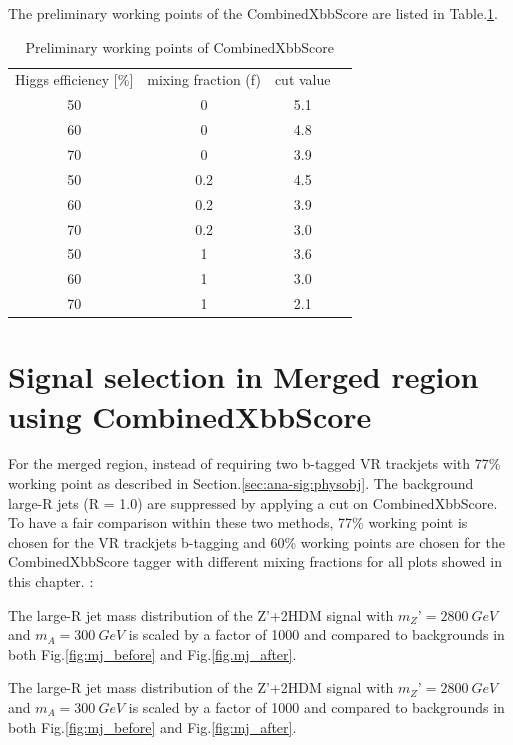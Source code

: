 The preliminary working points of the CombinedXbbScore are listed in Table.\ref{tab:combxbb}.

\begin{table}
    \footnotesize{
        \begin{center}
            \begin{tabular}{ c |c |c |c}
                \hline
                \hline

                Higgs efficiency [\%]	& mixing fraction (f)	& cut value \\
                50	&0	&5.1	 \\
                60	&0	&4.8	 \\
                70	&0	&3.9	 \\
                50	&0.2	&4.5	 \\
                60	&0.2	&3.9	 \\
                70	&0.2	&3.0	 \\
                50	&1	&3.6	 \\
                60	&1	&3.0	 \\
                70	&1	&2.1	\\
                \hline
                \hline
            \end{tabular}
        \end{center}
    }
    \caption{Preliminary working points of CombinedXbbScore}
    \label{tab:combxbb}
\end{table}


\section{Signal selection in Merged region using CombinedXbbScore}
\par For the merged region, instead of requiring two b-tagged VR trackjets  with 77\% working point as described in Section.\ref{sec:ana-sig:physobj}. The background large-R jets (R = 1.0) are suppressed by applying a cut on CombinedXbbScore. To have a fair comparison within these two methods, 77\% working point is chosen for the VR trackjets b-tagging and 60\% working points are chosen for the CombinedXbbScore tagger with different mixing fractions for all plots showed in this chapter.					:\par The large-R jet mass distribution of the Z’+2HDM signal with $m_Z’ = 2800~GeV$ and $m_A = 300~GeV$ is scaled by a factor of 1000 and compared to backgrounds in both Fig.\ref{fig:mj_before} and Fig.\ref{fig.mj_after}. 	
\par The large-R jet mass distribution of the Z’+2HDM signal with $m_Z’ = 2800~GeV$ and $m_A = 300~GeV$ is scaled by a factor of 1000 and compared to backgrounds in both Fig.\ref{fig:mj_before} and Fig.\ref{fig:mj_after}. 	

